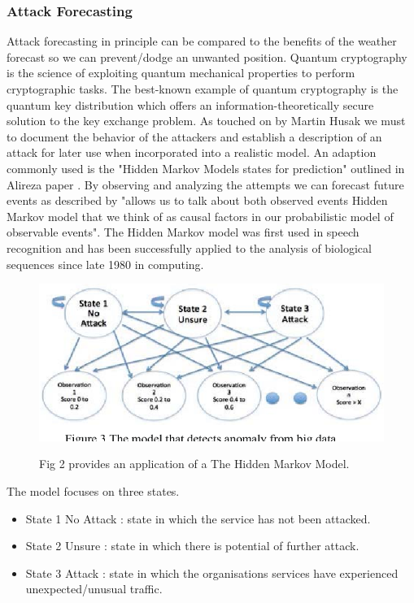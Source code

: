 \documentclass[journal]{IEEEtran}
\begin{document}
\subsubsection{Attack Forecasting}
Attack forecasting in principle can be compared to the benefits of the weather forecast so we can prevent/dodge an unwanted position. Quantum cryptography is the science of exploiting quantum mechanical properties to perform cryptographic tasks. The best-known example of quantum cryptography is the quantum key distribution which offers an information-theoretically secure solution to the key exchange problem. As touched on by Martin Husak \cite{attackForecasting} we must to document the behavior of the attackers and establish a description of an attack for later use when incorporated into a realistic model. An adaption commonly used is the "Hidden Markov Models states for prediction" outlined in Alireza paper \cite{prediction}. By observing and analyzing the attempts we can forecast future events as described by \cite{hmmn} "allows us to talk about both observed events Hidden Markov model that we think of as causal factors in our probabilistic model of observable events".\cite{modelDefinition}
The Hidden Markov model was first used in speech recognition and has been successfully applied to the analysis of biological sequences since late 1980 in computing.

\begin{figure}[h]
\centering
{\includegraphics[width=.45\textwidth]{LiteratureReviewAttackForecasting/Other/photos/hiddenmark.png}}



\caption{ Fig 2 provides an application of a The Hidden Markov Model. }

\end{figure}
The model focuses on three states. 

\begin{itemize}
  \item State 1 No  Attack  : state in which the service has not been attacked. 
  \item State 2 Unsure : state in which there is potential of further attack.
\item State 3   Attack : state in which the organisations services have experienced unexpected/unusual traffic.

\end{itemize}
\end{document}
